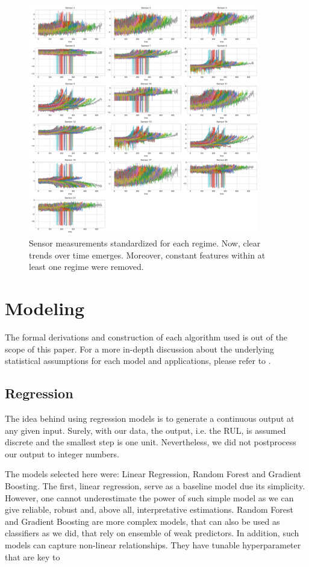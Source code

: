 \documentclass[letterpaper, 10 pt, conference, onecolumn]{ieeeconf}  %
\begin{document}
\begin{figure}[!h]
    \centering
    \includegraphics[width=0.9\textwidth]{plots/eda_sensors_std.png}
    \caption{Sensor measurements standardized for each regime. Now, clear trends over time emerges. Moreover, constant features within at least one regime were removed.}
    \label{fig:sensors-std}
\end{figure}


\section{Modeling}\label{sec:modeling}
The formal derivations and construction of each algorithm used is out of the scope of this paper. For a more in-depth discussion about the underlying statistical assumptions for each model and applications, please refer to \cite{friedman2001elements}.

\subsection{Regression}
The idea behind using regression models is to generate a continuous output at any given input. Surely, with our data, the output, i.e. the RUL, is assumed discrete and the smallest step is one unit. Nevertheless, we did not postprocess our output to integer numbers.

The models selected here were: Linear Regression, Random Forest and Gradient Boosting. The first, linear regression, serve as a baseline model due its simplicity. However, one cannot underestimate the power of such simple model as we can give reliable, robust and, above all, interpretative estimations. Random Forest and Gradient Boosting are more complex models, that can also be used as classifiers as we did, that rely on ensemble of weak predictors. In addition, such models can capture non-linear relationships. They have tunable hyperparameter that are key to 
\end{document}
